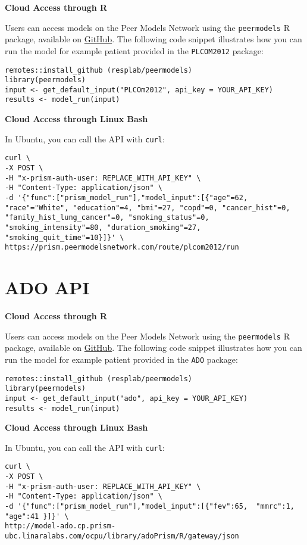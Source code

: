 \documentclass[
]{book}
\begin{document}
\textbf{Cloud Access through R}

Users can access models on the Peer Models Network using the \texttt{peermodels} R package, available on \href{https://github.com/resplab/peermodels}{GitHub}. The following code snippet illustrates how you can run the model for example patient provided in the \texttt{PLCOM2012} package:

\begin{verbatim}
remotes::install_github (resplab/peermodels)
library(peermodels)
input <- get_default_input("PLCOm2012", api_key = YOUR_API_KEY)
results <- model_run(input)
\end{verbatim}

\textbf{Cloud Access through Linux Bash}

In Ubuntu, you can call the API with \texttt{curl}:

\begin{verbatim}
curl \
-X POST \
-H "x-prism-auth-user: REPLACE_WITH_API_KEY" \
-H "Content-Type: application/json" \
-d '{"func":["prism_model_run"],"model_input":[{"age"=62, "race"="White", "education"=4, "bmi"=27, "copd"=0, "cancer_hist"=0, "family_hist_lung_cancer"=0, "smoking_status"=0, "smoking_intensity"=80, "duration_smoking"=27, "smoking_quit_time"=10}]}' \
https://prism.peermodelsnetwork.com/route/plcom2012/run
\end{verbatim}

\hypertarget{ado-api}{%
\section{ADO API}\label{ado-api}}

\textbf{Cloud Access through R}

Users can access models on the Peer Models Network using the \texttt{peermodels} R package, available on \href{https://github.com/resplab/peermodels}{GitHub}. The following code snippet illustrates how you can run the model for example patient provided in the \texttt{ADO} package:

\begin{verbatim}
remotes::install_github (resplab/peermodels)
library(peermodels)
input <- get_default_input("ado", api_key = YOUR_API_KEY)
results <- model_run(input)
\end{verbatim}

\textbf{Cloud Access through Linux Bash}

In Ubuntu, you can call the API with \texttt{curl}:

\begin{verbatim}
curl \
-X POST \
-H "x-prism-auth-user: REPLACE_WITH_API_KEY" \
-H "Content-Type: application/json" \
-d '{"func":["prism_model_run"],"model_input":[{"fev":65,  "mmrc":1, "age":41 }]}' \
http://model-ado.cp.prism-ubc.linaralabs.com/ocpu/library/adoPrism/R/gateway/json
\end{verbatim}
\end{document}
